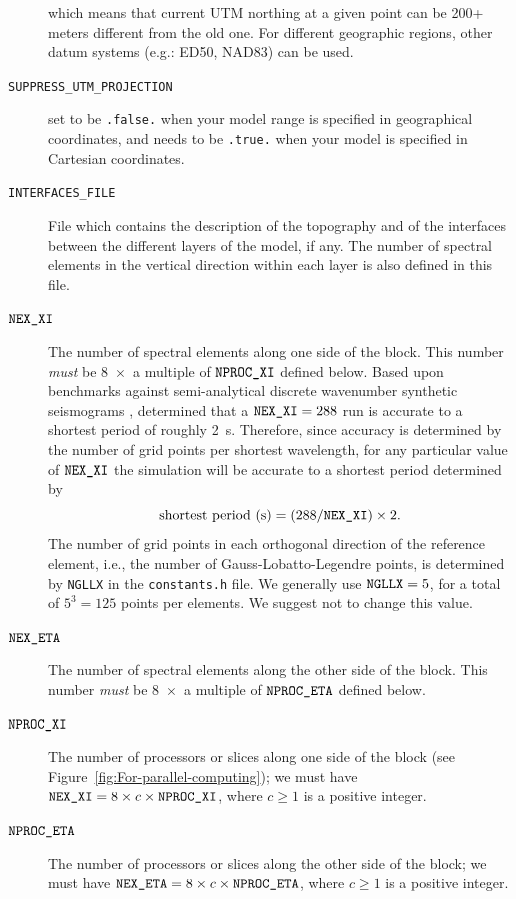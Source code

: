 \begin{description}
which means that current UTM northing at a given point can be 200+ meters different from the old one.
For different geographic regions, other datum systems (e.g.: ED50, NAD83) can be used.
%
\item [{\texttt{SUPPRESS\_UTM\_PROJECTION}}] set to be \texttt{.false.}
when your model range is specified in geographical coordinates, and
needs to be \texttt{.true.} when your model is specified in Cartesian
coordinates. 
\item [{\texttt{INTERFACES\_FILE }}] File which contains the description
of the topography and of the interfaces between the different layers
of the model, if any. The number of spectral elements in the vertical
direction within each layer is also defined in this file.
\item [{$\mbox{\texttt{NEX\_XI\/}}$}] The number of spectral elements along one side of the
block. This number \textit{must} be 8~$\times$~a multiple of $\mbox{\texttt{NPROC\_XI\/}}$
defined below. Based upon benchmarks against semi-analytical discrete
wavenumber synthetic seismograms \citep{KoLiTrSuStSh04}, determined
that a $\mbox{\texttt{NEX\_XI\/}}=288$ run is accurate to a shortest period of roughly
2~s. Therefore, since accuracy is determined by the number of grid
points per shortest wavelength, for any particular value of $\mbox{\texttt{NEX\_XI\/}}$
the simulation will be accurate to a shortest period determined by
\begin{equation}
\mbox{shortest period (s)}=(288/\mbox{\texttt{NEX\_XI\/}})\times2.\label{eq:shortest_period}
\end{equation}
 The number of grid points in each orthogonal direction of the reference
element, i.e., the number of Gauss-Lobatto-Legendre points, is determined
by \texttt{NGLLX} in the \texttt{constants.h} file. We generally use
$\mbox{\texttt{NGLLX\/}}=5$, for a total of $5^{3}=125$ points per
elements. We suggest not to change this value.
\item [{$\mbox{\texttt{NEX\_ETA\/}}$}] The number of spectral elements along the other side
of the block. This number \textit{must} be 8~$\times$~a multiple
of $\mbox{\texttt{NPROC\_ETA\/}}$ defined below.
\item [{$\mbox{\texttt{NPROC\_XI\/}}$}] The number of processors or slices along one side
of the block (see Figure~\ref{fig:For-parallel-computing}); we must
have $\mbox{\texttt{NEX\_XI\/}}=8\times c\times\mbox{\texttt{NPROC\_XI\/}}$, where $c\ge1$ is a positive
integer.
\item [{$\mbox{\texttt{NPROC\_ETA\/}}$}] The number of processors or slices along the other
side of the block; we must have $\mbox{\texttt{NEX\_ETA\/}}=8\times c\times\mbox{\texttt{NPROC\_ETA\/}}$,
where $c\ge1$ is a positive integer.

\end{description}
